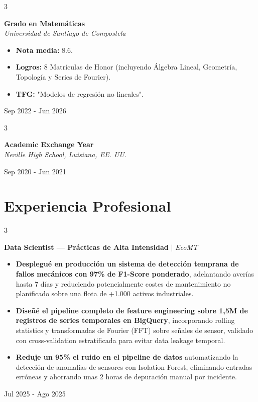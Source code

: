 \documentclass[10pt, letterpaper]{article}
\newenvironment{highlights}{
    \begin{itemize}[
        topsep=0.10 cm,
        parsep=0.10 cm,
        partopsep=0pt,
        itemsep=0pt,
        leftmargin=0.4 cm + 10pt
    ]
}{
    \end{itemize}
} %
\newenvironment{threecolentry}[3][]{
    \onecolentry
    \def\thirdColumn{#3}
    \setcolumnwidth{0 cm, \fill, 4.5 cm}
    \begin{paracol}{3}
    \noindent{\raggedright #2}\switchcolumn
}{
    \switchcolumn \raggedleft \thirdColumn
    \end{paracol}
    \endonecolentry
} %
\begin{document}
        \medskip
        
        \begin{threecolentry}{}{
            Sep 2022 - Jun 2026
        }
            \textbf{Grado en Matemáticas}\\
            \textit{Universidad de Santiago de Compostela} 
            \begin{highlights}
                \item \textbf{Nota media:} $8.6$.
                \item \textbf{Logros:} 8 Matrículas de Honor (incluyendo Álgebra Lineal, Geometría, Topología y Series de Fourier).
                \item \textbf{TFG:} "Modelos de regresión no lineales".
            \end{highlights}
        \end{threecolentry}

        \medskip

        \begin{threecolentry}{}{Sep 2020 - Jun 2021}
            \textbf{Academic Exchange Year}\\
            \textit{Neville High School, Luisiana, EE. UU.}
        \end{threecolentry}


    \medskip
    
    \section{Experiencia Profesional}


        \begin{threecolentry}{}{
            Jul 2025 - Ago 2025
        }
            \textbf{Data Scientist — Prácticas de Alta Intensidad} $\mid$ \textit{EcoMT}  
            \begin{highlights}
                \item \textbf{Desplegué en producción un sistema de detección temprana de fallos mecánicos con 97\% de F1-Score ponderado}, adelantando averías hasta 7 días y reduciendo potencialmente costes de mantenimiento no planificado sobre una flota de +1.000 activos industriales.
                \item  \textbf{Diseñé el pipeline completo de feature engineering sobre 1,5M de registros de series temporales en BigQuery}, incorporando rolling statistics y transformadas de Fourier (FFT) sobre señales de sensor, validado con cross-validation estratificada para evitar data leakage temporal.
                \item \textbf{Reduje un 95\% el ruido en el pipeline de datos} automatizando la detección de anomalías de sensores con Isolation Forest, eliminando entradas erróneas y ahorrando unas 2 horas de depuración manual por incidente.
            \end{highlights}
        \end{threecolentry}
\end{document}
